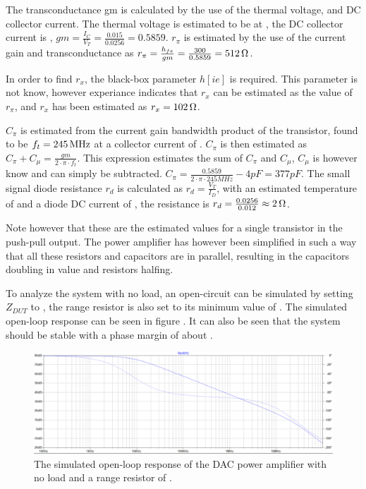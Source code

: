 The transconductance gm is calculated by the use of the thermal voltage, and DC collector current. The thermal voltage is estimated to be  at , the DC collector current is , $gm = \frac{I_C}{V_T} = \frac{0.015}{0.0256} = 0.5859$. $r_\pi$ is estimated by the use of the current gain and transconductance as $r_\pi = \frac{h_{fe}}{gm} = \frac{300}{0.5859} = \SI{512}{\ohm}$. 

In order to find $r_x$, the black-box parameter $h[ie]$ is required. This parameter is not know, however experiance indicates that $r_x$ can be estimated as  the value of $r_\pi$, and $r_x$ has been estimated as $r_x = \SI{102}{\ohm}$.

$C_\pi$ is estimated from the current gain bandwidth product of the transistor, found to be $f_t = \SI{245}{\mega\hertz}$ at a collector current of . $C_\pi$ is then estimated as $C_\pi +C_\mu = \frac{gm}{2\cdot\pi\cdot f_t}$. This expression estimates the sum of $C_\pi$ and $C_\mu$, $C_\mu$ is however know and can simply be subtracted. $C_\pi = \frac{0.5859}{2\cdot\pi\cdot 245 MHz} -4 pF = 377 pF$. The small signal diode resistance $r_d$ is calculated as $r_d = \frac{V_T}{I_D}$, with an estimated temperature of  and a diode DC current of , the resistance is $r_d = \frac{0.0256}{0.012} \approx \SI{2}{\ohm}$. 

Note however that these are the estimated values for a single transistor in the push-pull output. The power amplifier has however been simplified in such a way that all these resistors and capacitors are in parallel, resulting in the capacitors doubling in value and resistors halfing. 


To analyze the system with no load, an open-circuit can be simulated by setting $Z_{DUT}$ to , the range resistor is also set to its minimum value of . The simulated open-loop response can be seen in figure . It can also be seen that the system should be stable with a phase margin of about . 

\begin{figure}[H]
    \centering
    \includegraphics[clip, trim=0 0 0 0, width=1\textwidth]{Sections/7_SystemDesign/Figures/7_1_1_5_DAC_PWR_AMP_NO_LOAD.pdf}
    \caption{The simulated open-loop response of the DAC power amplifier with no load and a range resistor of .}
    \label{fig_7_1_1_5_DAC_POWER_AMP_SIM_NL}
\end{figure}

